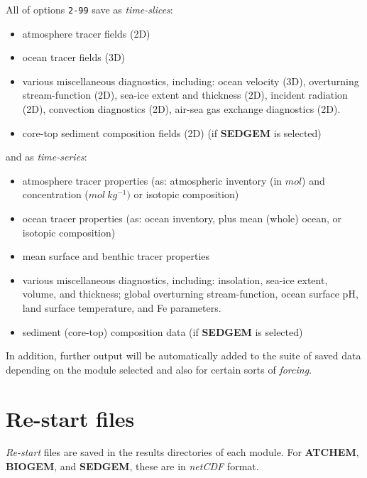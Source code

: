 \documentclass[11pt,fleqn]{book} %
\begin{document}
\noindent All of options \texttt{2-99} save as \textit{time-slices}:
\begin{itemize}[noitemsep]
\setlength{\itemindent}{.2in}
\item atmosphere tracer fields (2D)
\item ocean tracer fields (3D)
\item various miscellaneous diagnostics, including: ocean velocity (3D), overturning stream-function (2D), sea-ice extent and thickness (2D), incident radiation (2D), convection diagnostics (2D), air-sea gas exchange diagnostics (2D).
\item core-top sediment composition fields (2D) (if \textbf{SEDGEM} is selected)
\end{itemize}
and as \textit{time-series}:
\begin{itemize}[noitemsep]
\setlength{\itemindent}{.2in}
\item atmosphere tracer properties (as: atmospheric inventory (in \(mol\)) and concentration (\(mol\:kg^{-1})\) or isotopic composition)
\item ocean tracer properties (as: ocean inventory, plus mean (whole) ocean, or isotopic composition)
\item mean surface and benthic tracer properties
\item various miscellaneous diagnostics, including: insolation, sea-ice extent, volume, and thickness; global overturning stream-function, ocean surface pH, land surface temperature, and Fe parameters.
\item sediment (core-top) composition data (if \textbf{SEDGEM} is selected)
\end{itemize}

In addition, further output will be automatically added to the suite of saved data depending on the module selected and also for certain sorts of \textit{forcing}.


\newpage


\section{Re-start files}

\textit{Re-start} files are saved in the results directories of each module.
For \textbf{ATCHEM}, \textbf{BIOGEM}, and \textbf{SEDGEM}, these are in \textit{netCDF} format.
\end{document}
